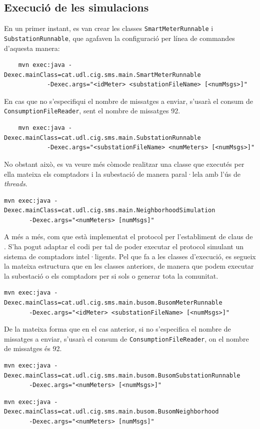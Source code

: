 \subsection{Execució de les simulacions}
En un primer instant, es van crear les classes \texttt{SmartMeterRunnable} i \texttt{SubstationRunnable}, que agafaven la configuració per línea de commandes d'aquesta manera:
\begin{verbatim}
	mvn exec:java -Dexec.mainClass=cat.udl.cig.sms.main.SmartMeterRunnable
	        -Dexec.args="<idMeter> <substationFileName> [<numMsgs>]"
\end{verbatim}
En cas que no s'especifiqui el nombre de missatges a enviar, s'usarà el consum de \texttt{ConsumptionFileReader}, sent el nombre de missatges 92.
\begin{verbatim}
	mvn exec:java -Dexec.mainClass=cat.udl.cig.sms.main.SubstationRunnable 
	        -Dexec.args="<substationFileName> <numMeters> [<numMsgs>]"
\end{verbatim}
No obstant això, es va veure més còmode realitzar una classe que executés per ella mateixa els comptadors i la subestació de manera paral·lela amb l'ús de \textit{threads}.
\begin{verbatim}
mvn exec:java -Dexec.mainClass=cat.udl.cig.sms.main.NeighborhoodSimulation 
       -Dexec.args="<numMeters> [numMsgs]"
\end{verbatim}
A més a més, com que està implementat el protocol \cite{busom} per l'establiment de claus de \cite{recsi}. S'ha pogut adaptar el codi per tal de poder executar el protocol \cite{busom} simulant un sistema de comptadors intel·ligents. Pel que fa a les classes d'execució, es segueix la mateixa estructura que en les classes anteriors, de manera que podem executar la subestació o els comptadors per si sols o generar tota la comunitat.
\begin{verbatim}
mvn exec:java -Dexec.mainClass=cat.udl.cig.sms.main.busom.BusomMeterRunnable
       -Dexec.args="<idMeter> <substationFileName> [<numMsgs>]"
\end{verbatim}
De la mateixa forma que en el cas anterior,  si no s'especifica el nombre de missatges a enviar, s'usarà el consum de \texttt{ConsumptionFileReader}, on el nombre de missatges és 92.
\begin{verbatim}
mvn exec:java -Dexec.mainClass=cat.udl.cig.sms.main.busom.BusomSubstationRunnable 
       -Dexec.args="<numMeters> [<numMsgs>]"
\end{verbatim}
\begin{verbatim}
mvn exec:java -Dexec.mainClass=cat.udl.cig.sms.main.busom.BusomNeighborhood
       -Dexec.args="<numMeters> [numMsgs]"
\end{verbatim}


